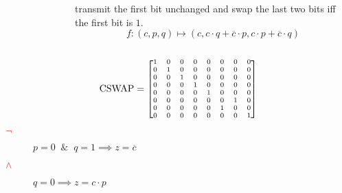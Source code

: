 \documentclass[UTF8,11pt,colorlinks,compress,openany]{beamer}%
\begin{document}
\begin{frame}
\begin{columns}
\begin{figure}[H]
\end{figure}\vspace*{-2ex}
transmit the first bit unchanged and swap the last two bits iff the first bit is $1$.
\[f:(c,p,q)\mapsto(c,c\cdot q+\overline{c}\cdot p,c\cdot p+\overline{c}\cdot q)\]
\end{columns}
\[\scriptsize\operatorname{CSWAP}=
\begin{bmatrix}
1 & 0 & 0 & 0 & 0 & 0 & 0 & 0 \\
0 & 1 & 0 & 0 & 0 & 0 & 0 & 0 \\
0 & 0 & 1 & 0 & 0 & 0 & 0 & 0 \\
0 & 0 & 0 & 1 & 0 & 0 & 0 & 0 \\
0 & 0 & 0 & 0 & 1 & 0 & 0 & 0 \\
0 & 0 & 0 & 0 & 0 & 0 & 1 & 0 \\
0 & 0 & 0 & 0 & 0 & 1 & 0 & 0 \\
0 & 0 & 0 & 0 & 0 & 0 & 0 & 1 \\
\end{bmatrix}
\]\vspace*{-1ex}
\begin{description}
\item[\textcolor{red}{$\neg$}] $p=0\;\;\&\;\;q=1\implies z=\overline{c}$
\item[\textcolor{red}{$\wedge$}] $q=0\implies z=c\cdot p$
\end{description}
\end{frame}
\end{document}

